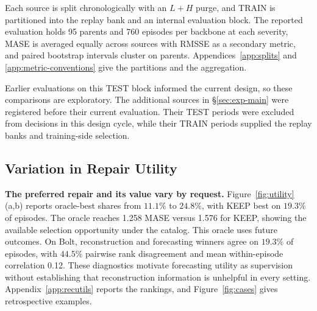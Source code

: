 \documentclass{article}
\begin{document}
Each source is split chronologically with an $L+H$ purge, and TRAIN is partitioned into the
replay bank and an internal evaluation block. The reported evaluation holds 95 parents and 760
episodes per backbone at each severity, MASE is averaged equally across sources with RMSSE as
a secondary metric, and paired bootstrap intervals cluster on parents.
Appendices~\ref{app:splits} and \ref{app:metric-conventions} give the partitions and the
aggregation.

Earlier evaluations on this TEST block informed the current design, so these comparisons
are exploratory. The additional sources in \S\ref{sec:exp-main} were registered before their
current evaluation. Their TEST periods were excluded from decisions in this design cycle,
while their TRAIN periods supplied the replay banks and training-side selection.

\subsection{Variation in Repair Utility}
\label{sec:exp-exists}
\textbf{The preferred repair and its value vary by request.}
Figure~\ref{fig:utility}(a,b) reports oracle-best shares from $11.1\%$ to $24.8\%$, with KEEP
best on $19.3\%$ of episodes. The oracle reaches 1.258 MASE versus 1.576 for KEEP, showing
the available selection opportunity under the catalog. This oracle uses future outcomes.
On Bolt, reconstruction and forecasting winners agree on $19.3\%$ of episodes, with
$44.5\%$ pairwise rank disagreement and mean within-episode correlation 0.12.
These diagnostics motivate forecasting utility as supervision without establishing that
reconstruction information is unhelpful in every setting. Appendix~\ref{app:recutils}
reports the rankings, and Figure~\ref{fig:cases} gives retrospective examples.
\end{document}
